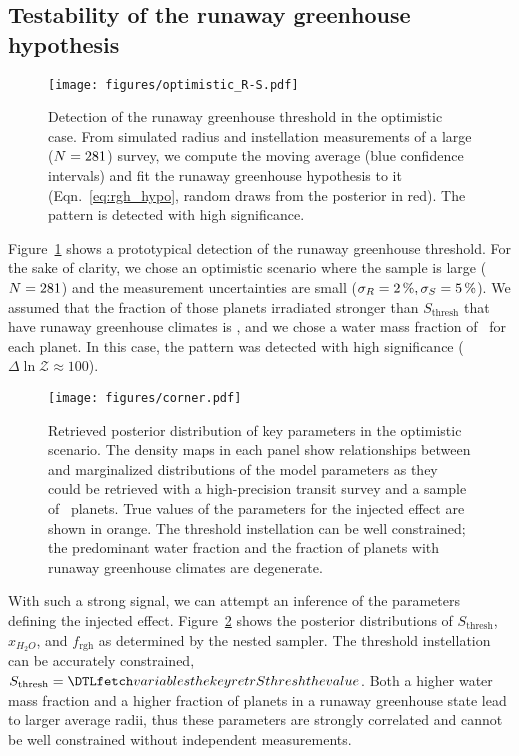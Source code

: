 \documentclass[twocolumn]{aastex631}
\begin{document}
\subsection{Testability of the runaway greenhouse hypothesis}
\begin{figure}[ht!]
    \begin{centering}
        \texttt{[image: figures/optimistic\_R-S.pdf]}
        \caption{
        Detection of the runaway greenhouse threshold in the optimistic case.
        From simulated radius and instellation measurements of a large ($N = 281$) survey, we compute the moving average (blue confidence intervals) and fit the runaway greenhouse hypothesis to it (Eqn.~\ref{eq:rgh_hypo}, random draws from the posterior in red).
            The pattern is detected with high significance.
        }
        \label{fig:optimistic_R-S}
    \end{centering}
\end{figure}
Figure~\ref{fig:optimistic_R-S} shows a prototypical detection of the runaway greenhouse threshold.
For the sake of clarity, we chose an optimistic scenario where the sample is large ($N = 281$) and the measurement uncertainties are small ($\sigma_{R} = \SI{2}{\percent}, \sigma_{S} = \SI{5}{\percent}$).
We assumed that the fraction of those planets irradiated stronger than $S_\mathrm{thresh}$ that have runaway greenhouse climates is \frgh, and we chose a water mass fraction of \wrr\ for each planet.
In this case, the pattern was detected with high significance ($\Delta \ln \mathcal{Z} \approx 100$).


\begin{figure}[ht!]
    \begin{centering}
        \texttt{[image: figures/corner.pdf]}
        \caption{
            Retrieved posterior distribution of key parameters in the optimistic scenario. The density maps in each panel show relationships between and marginalized distributions of the model parameters as they could be retrieved with a high-precision transit survey and a sample of \Nplanets\ planets. True values of the parameters for the injected effect are shown in orange. The threshold instellation can be well constrained; the predominant water fraction and the fraction of planets with runaway greenhouse climates are degenerate.
        }
        \label{fig:cornerplot}
    \end{centering}
\end{figure}
With such a strong signal, we can attempt an inference of the parameters defining the injected effect.
Figure~\ref{fig:cornerplot} shows the posterior distributions of $S_\mathrm{thresh}$, $x_{H_2O}$, and $f_\mathrm{rgh}$ as determined by the nested sampler.
The threshold instellation can be accurately constrained, $S_\mathrm{thresh} = \var{retrSthresh}$.
Both a higher water mass fraction and a higher fraction of planets in a runaway greenhouse state lead to larger average radii, thus these parameters are strongly correlated and cannot be well constrained without independent measurements.
\end{document}
